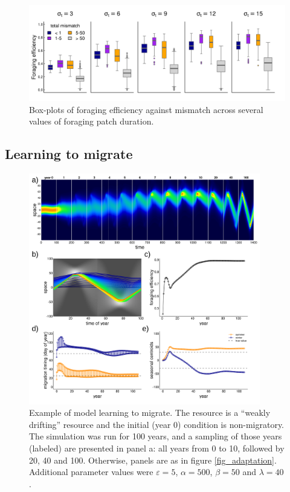 \documentclass[utf8]{frontiersSCNS} %
\begin{document}
	\begin{figure}
		\includegraphics[width = \textwidth]{figures/ForagingEfficiency.png}
		\caption{\label{fig_boxplotFE} Box-plots of foraging efficiency against mismatch across several values of foraging patch duration.}
	\end{figure}
	
\subsection{Learning to migrate}
	
	\begin{figure}
		\includegraphics[width = 0.9\textwidth]{figures/example2_learningtomigrate_lettered.png} 
		
		\caption{\label{fig_learningtomigrate} Example of model learning to migrate. The resource is a ``weakly drifting'' resource and the initial (year 0) condition is non-migratory. The simulation was run for 100 years, and a sampling of those years (labeled) are presented in panel a: all years from 0 to 10, followed by 20, 40 and 100. Otherwise, panels are as in figure \ref{fig_adaptation}. Additional parameter values were $\varepsilon = 5$, $\alpha = 500$, $\beta = 50$ and $\lambda = 40$.}
	\end{figure}
	
\end{document}
